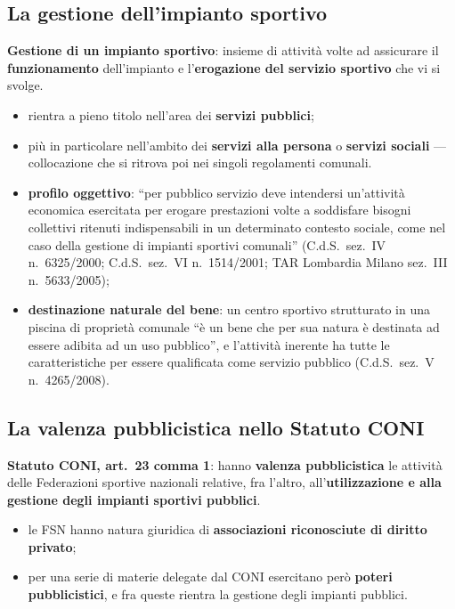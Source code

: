 \subsection{La gestione dell'impianto sportivo}

\textbf{Gestione di un impianto sportivo}: insieme di attività volte ad assicurare il
\textbf{funzionamento} dell'impianto e l'\textbf{erogazione del servizio sportivo} che vi si
svolge.

\begin{itemize}
  \item rientra a pieno titolo nell'area dei \textbf{servizi pubblici};
  \item più in particolare nell'ambito dei \textbf{servizi alla persona} o \textbf{servizi
    sociali} --- collocazione che si ritrova poi nei singoli regolamenti comunali.
\end{itemize}


\begin{itemize}
  \item \textbf{profilo oggettivo}: ``per pubblico servizio deve intendersi un'attività economica
    esercitata per erogare prestazioni volte a soddisfare bisogni collettivi ritenuti
    indispensabili in un determinato contesto sociale, come nel caso della gestione di impianti
    sportivi comunali'' (C.d.S.\ sez.\ IV n.\ 6325/2000; C.d.S.\ sez.\ VI n.\ 1514/2001; TAR
    Lombardia Milano sez.\ III n.\ 5633/2005);
  \item \textbf{destinazione naturale del bene}: un centro sportivo strutturato in una piscina di
    proprietà comunale ``è un bene che per sua natura è destinata ad essere adibita ad un uso
    pubblico'', e l'attività inerente ha tutte le caratteristiche per essere qualificata come
    servizio pubblico (C.d.S.\ sez.\ V n.\ 4265/2008).
\end{itemize}

\subsection{La valenza pubblicistica nello Statuto CONI}

\textbf{Statuto CONI, art.\ 23 comma 1}: hanno \textbf{valenza pubblicistica} le attività delle
Federazioni sportive nazionali relative, fra l'altro, all'\textbf{utilizzazione e alla gestione
degli impianti sportivi pubblici}.

\begin{itemize}
  \item le FSN hanno natura giuridica di \textbf{associazioni riconosciute di diritto privato};
  \item per una serie di materie delegate dal CONI esercitano però \textbf{poteri
    pubblicistici}, e fra queste rientra la gestione degli impianti pubblici.
\end{itemize}

